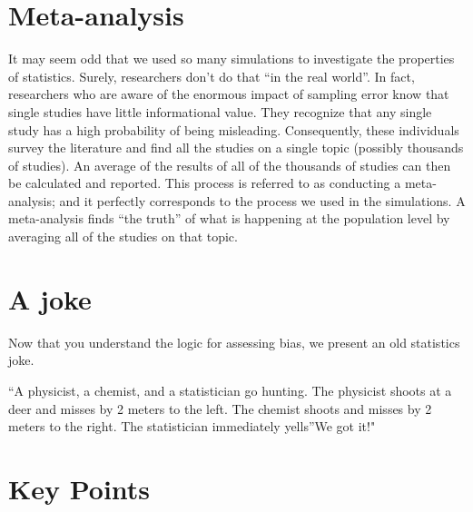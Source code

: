 \documentclass[
]{krantz}
\renewenvironment{quote}{\begin{VF}}{\end{VF}}
\begin{document}
\singlespacing

\hypertarget{meta-analysis}{%
\section{Meta-analysis}\label{meta-analysis}}

It may seem odd that we used so many simulations to investigate the properties of statistics. Surely, researchers don't do that ``in the real world''. In fact, researchers who are aware of the enormous impact of sampling error know that single studies have little informational value. They recognize that any single study has a high probability of being misleading. Consequently, these individuals survey the literature and find all the studies on a single topic (possibly thousands of studies). An average of the results of all of the thousands of studies can then be calculated and reported. This process is referred to as conducting a meta-analysis; and it perfectly corresponds to the process we used in the simulations. A meta-analysis finds ``the truth'' of what is happening at the population level by averaging all of the studies on that topic.

\hypertarget{a-joke}{%
\section{A joke}\label{a-joke}}

Now that you understand the logic for assessing bias, we present an old statistics joke.

\begin{quote}
``A physicist, a chemist, and a statistician go hunting. The physicist shoots at a deer and misses by 2 meters to the left. The chemist shoots and misses by 2 meters to the right. The statistician immediately yells''We got it!"
\end{quote}

\hypertarget{key-points}{%
\section{Key Points}\label{key-points}}
\end{document}
